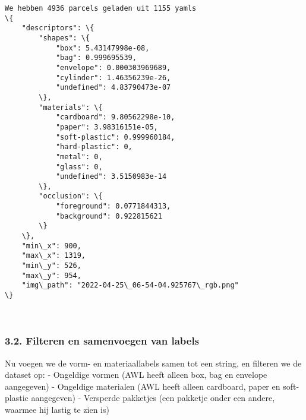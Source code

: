 \documentclass[11pt]{article}
\begin{document}
    \begin{Verbatim}[commandchars=\\\{\}]
We hebben 4936 parcels geladen uit 1155 yamls
\{
    "descriptors": \{
        "shapes": \{
            "box": 5.43147998e-08,
            "bag": 0.999695539,
            "envelope": 0.000303969689,
            "cylinder": 1.46356239e-26,
            "undefined": 4.83790473e-07
        \},
        "materials": \{
            "cardboard": 9.80562298e-10,
            "paper": 3.98316151e-05,
            "soft-plastic": 0.999960184,
            "hard-plastic": 0,
            "metal": 0,
            "glass": 0,
            "undefined": 3.5150983e-14
        \},
        "occlusion": \{
            "foreground": 0.0771844313,
            "background": 0.922815621
        \}
    \},
    "min\_x": 900,
    "max\_x": 1319,
    "min\_y": 526,
    "max\_y": 954,
    "img\_path": "2022-04-25\_06-54-04.925767\_rgb.png"
\}
    \end{Verbatim}

    \begin{center}
    \end{center}
    { \hspace*{\fill} \\}
    
    \subsubsection{3.2. Filteren en samenvoegen van
labels}\label{filteren-en-samenvoegen-van-labels}

Nu voegen we de vorm- en materiaallabels samen tot een string, en
filteren we de dataset op: - Ongeldige vormen (AWL heeft alleen box, bag
en envelope aangegeven) - Ongeldige materialen (AWL heeft alleen
cardboard, paper en soft-plastic aangegeven) - Versperde pakketjes (een
pakketje onder een andere, waarmee hij lastig te zien is)
\end{document}
